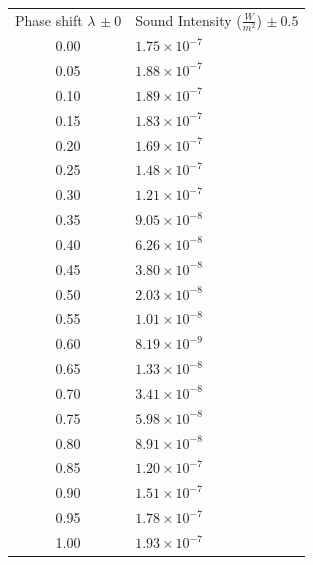 \documentclass[index]{subfiles}
\begin{document}
\begin{table}[H]
    \centering
    \begin{tabularx}{0.6\textwidth}{c|X}
        Phase shift \(\lambda\) \(\pm\ 0\) & Sound Intensity (\(\frac{W}{m^2}\)) \(\pm\ 0.5\) \\
        0.00                               & \(1.75\times 10^{-7}\)                           \\
        0.05                               & \(1.88\times 10^{-7}\)                           \\
        0.10                               & \(1.89\times 10^{-7}\)                           \\
        0.15                               & \(1.83\times 10^{-7}\)                           \\
        0.20                               & \(1.69\times 10^{-7}\)                           \\
        0.25                               & \(1.48\times 10^{-7}\)                           \\
        0.30                               & \(1.21\times 10^{-7}\)                           \\
        0.35                               & \(9.05\times 10^{-8}\)                           \\
        0.40                               & \(6.26\times 10^{-8}\)                           \\
        0.45                               & \(3.80\times 10^{-8}\)                           \\
        0.50                               & \(2.03\times 10^{-8}\)                           \\
        0.55                               & \(1.01\times 10^{-8}\)                           \\
        0.60                               & \(8.19\times 10^{-9}\)                           \\
        0.65                               & \(1.33\times 10^{-8}\)                           \\
        0.70                               & \(3.41\times 10^{-8}\)                           \\
        0.75                               & \(5.98\times 10^{-8}\)                           \\
        0.80                               & \(8.91\times 10^{-8}\)                           \\
        0.85                               & \(1.20\times 10^{-7}\)                           \\
        0.90                               & \(1.51\times 10^{-7}\)                           \\
        0.95                               & \(1.78\times 10^{-7}\)                           \\
        1.00                               & \(1.93\times 10^{-7}\)                           \\
    \end{tabularx}
\end{table}
\end{document}
